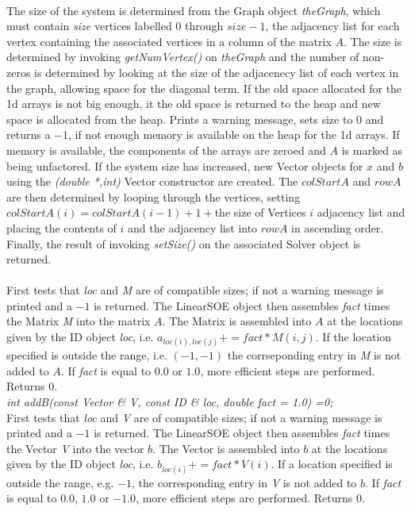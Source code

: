  \\ 
The size of the system is determined from the Graph object {\em
theGraph}, which must contain {\em size} vertices labelled $0$ through
$size-1$, the adjacency list for each vertex containing the associated
vertices in a column of the matrix $A$. The size is determined by
invoking {\em getNumVertex()} on {\em theGraph} and the number of
non-zeros is determined by looking at the size of the adjacenecy list
of each vertex in the graph, allowing space for the diagonal term. If
the old space allocated for the 1d arrays is not big enough, it the
old space is returned to the heap and new space is allocated from the
heap. Prints a warning message, sets size to $0$ and returns a $-1$,
if not enough memory is available on the heap for the 1d arrays. If
memory is available, the components of the arrays are 
zeroed and $A$ is marked as being unfactored. If the system size has
increased, new Vector objects for $x$ and $b$ using the {\em (double
*,int)} Vector constructor are created. The $colStartA$ and $rowA$ are
then determined by looping through the vertices, setting $colStartA(i)
= colStartA(i-1) + 1 + $the size of Vertices $i$ adjacency list and 
placing the contents of $i$ and the adjacency list into $rowA$ in
ascending order. Finally, the result of invoking {\em setSize()} on
the associated Solver object is returned. \\ 


 \\
First tests that {\em loc} and {\em M} are of compatible sizes; if not
a warning message is printed and a $-1$ is returned. The LinearSOE
object then assembles {\em fact} times the Matrix {\em 
M} into the matrix $A$. The Matrix is assembled into $A$ at the
locations given by the ID object {\em loc}, i.e. $a_{loc(i),loc(j)} +=
fact * M(i,j)$. If the location specified is outside the range,
i.e. $(-1,-1)$ the corrseponding entry in {\em M} is not added to
$A$. If {\em fact} is equal to $0.0$ or $1.0$, more efficient steps
are performed. Returns $0$.  \\


{\em int addB(const Vector \& V, const ID \& loc,
double fact = 1.0) =0;} \\
First tests that {\em loc} and {\em V} are of compatible sizes; if not
a warning message is printed and a $-1$ is returned. The LinearSOE
object then assembles {\em fact} times the Vector {\em V} into
the vector $b$. The Vector is assembled into $b$ at the locations
given by the ID object {\em loc}, i.e. $b_{loc(i)} += fact * V(i)$. If a
location specified is outside the range, e.g. $-1$, the corresponding
entry in {\em V} is not added to $b$. If {\em fact} is equal to $0.0$,
$1.0$ or $-1.0$, more efficient steps are performed. Returns $0$. \\


